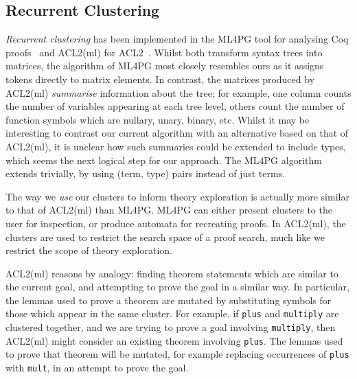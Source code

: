 \subsection{Recurrent Clustering}

\emph{Recurrent clustering} has been implemented in the
ML4PG tool for analysing Coq proofs~\cite{journals/corr/abs-1212-3618} and
ACL2(ml) for ACL2~\cite{heras2013proof}. Whilst both transform syntax trees into
matrices, the algorithm of ML4PG most closely resembles ours as it assigns tokens directly to matrix elements. In contrast,
the matrices produced by ACL2(ml) \emph{summarise} information about the tree;
for example, one column counts the number of variables appearing at each tree
level, others count the number of function symbols which are nullary, unary,
binary, etc. Whilst it may be interesting to contrast our current algorithm with
an alternative based on that of ACL2(ml), it is unclear how such summaries could
be extended to include types, which seems the next logical step for our
approach. The ML4PG algorithm extends trivially, by using (term, type) pairs
instead of just terms.

The way we \emph{use} our clusters to inform theory exploration is actually more
similar to that of ACL2(ml) than ML4PG. ML4PG can either present clusters to the
user for inspection, or produce automata for recreating proofs. In ACL2(ml), the
clusters are used to restrict the search space of a proof search, much like we
restrict the scope of theory exploration.

ACL2(ml) reasons by analogy: finding theorem statements which are similar to the
current goal, and attempting to prove the goal in a similar way. In particular,
the lemmas used to prove a theorem are mutated by substituting symbols for those
which appear in the same cluster. For example, if \texttt{plus} and
\texttt{multiply} are clustered together, and we are trying to prove a goal
involving \texttt{multiply}, then ACL2(ml) might consider an existing theorem
involving \texttt{plus}. The lemmas used to prove that theorem will be mutated,
for example replacing occurrences of \texttt{plus} with \texttt{mult}, in an
attempt to prove the goal.

\iffalse
Whilst we do not currently reason by analogy, this is an interesting area for
future work in theory exploration: given a set of theorems relating particular
terms, we might form conjectures regarding similar terms found through
clustering.
\fi

